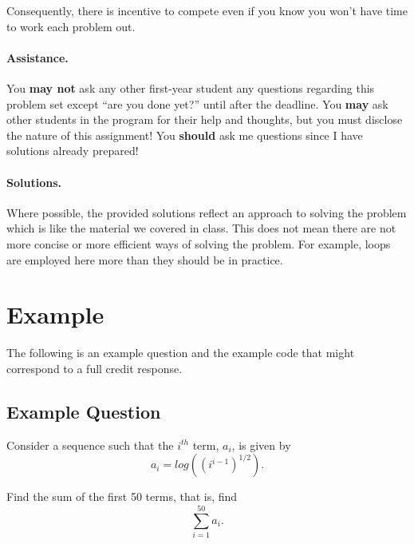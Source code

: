 \documentclass[10pt,letterpaper]{article}
\begin{document}
Consequently, there is incentive to compete even if you know you won't
have time to work each problem out.

\paragraph{Assistance.} You \textbf{may not} ask any other first-year
student any questions regarding this problem set except ``are you done
yet?''  until after the deadline. You \textbf{may} ask other students
in the program for their help and thoughts, but you must disclose the
nature of this assignment! You \textbf{should} ask me questions since
I have solutions already prepared!

\paragraph{Solutions.} Where possible, the provided solutions reflect
an approach to solving the problem which is like the material we
covered in class. This does not mean there are not more concise or
more efficient ways of solving the problem. For example, loops are
employed here more than they should be in practice.

\section*{Example}

The following is an example question and the example code that might
correspond to a full credit response.

\subsection*{Example Question}
Consider a sequence such that the $i^{th}$ term, $a_i$, is given
by
\[
a_i = log\left((i^{i - 1})^{1/2}\right).
\]

Find the sum of the first 50 terms, that is, find
\[
\sum_{i = 1}^{50} a_i.
\]
\end{document}
